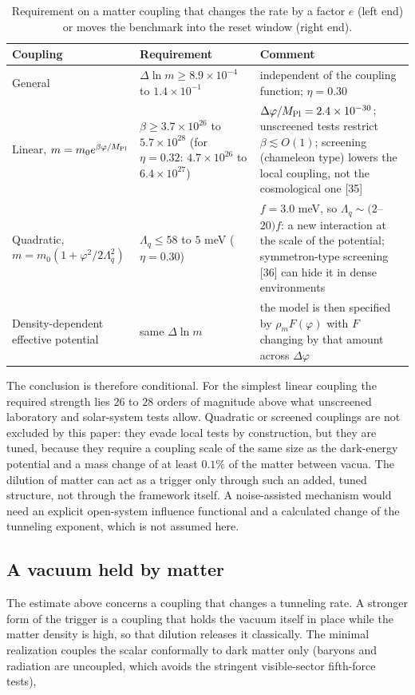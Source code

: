 \documentclass[11pt,a4paper]{article}
\begin{document}
\begin{table}[htbp]\centering\small
\caption{Requirement on a matter coupling that changes the rate by a factor $e$ (left end) or moves the benchmark into the reset window (right end).}
\begin{tabular}{>{\raggedright\arraybackslash}p{0.236\dimexpr\textwidth-6\tabcolsep\relax}>{\raggedright\arraybackslash}p{0.382\dimexpr\textwidth-6\tabcolsep\relax}>{\raggedright\arraybackslash}p{0.382\dimexpr\textwidth-6\tabcolsep\relax}}
\toprule
Coupling & Requirement & Comment \\ \midrule
General & $\Delta\ln m\ge8.9\times10^{-4}$ to $1.4\times10^{-1}$ & independent of the coupling function; $\eta=0.30$ \\
Linear, $m=m_0e^{\beta\varphi/M_{\rm Pl}}$ & $\beta\ge3.7\times10^{26}$ to $5.7\times10^{28}$ (for $\eta=0.32$: $4.7\times10^{26}$ to $6.4\times10^{27}$) & $\Delta\varphi/M_{\rm Pl}=2.4\times10^{-30}$; unscreened tests restrict $\beta\lesssim O(1)$; screening (chameleon type) lowers the local coupling, not the cosmological one [35] \\
Quadratic, $m=m_0(1+\varphi^2/2\Lambda_q^2)$ & $\Lambda_q\le58$ to $5$ meV ($\eta=0.30$) & $f=3.0$ meV, so $\Lambda_q\sim(2$--$20)f$: a new interaction at the scale of the potential; symmetron-type screening [36] can hide it in dense environments \\
Density-dependent effective potential & same $\Delta\ln m$ & the model is then specified by $\rho_m F(\varphi)$ with $F$ changing by that amount across $\Delta\varphi$ \\
\bottomrule
\end{tabular}
\end{table}
The conclusion is therefore conditional. For the simplest linear coupling the required strength lies $26$ to $28$ orders of magnitude above what unscreened laboratory and solar-system tests allow. Quadratic or screened couplings are not excluded by this paper: they evade local tests by construction, but they are tuned, because they require a coupling scale of the same size as the dark-energy potential and a mass change of at least $0.1\%$ of the matter between vacua. The dilution of matter can act as a trigger only through such an added, tuned structure, not through the framework itself. A noise-assisted mechanism would need an explicit open-system influence functional and a calculated change of the tunneling exponent, which is not assumed here.

\subsection{A vacuum held by matter}
The estimate above concerns a coupling that changes a tunneling rate. A stronger form of the trigger is a coupling that holds the vacuum itself in place while the matter density is high, so that dilution releases it classically. The minimal realization couples the scalar conformally to dark matter only (baryons and radiation are uncoupled, which avoids the stringent visible-sector fifth-force tests),
\end{document}
